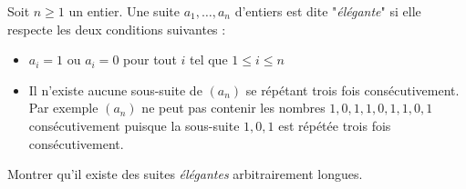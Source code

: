 Soit $n\ge 1$ un entier. Une suite $a_1, \dots, a_n$ d'entiers est dite "\textit{élégante}" si elle respecte les deux conditions suivantes :
\begin{itemize}
\item $a_i=1$ ou $a_i=0$ pour tout $i$ tel que $1\le i\le n$
\item Il n'existe aucune sous-suite de $(a_n)$ se répétant trois fois consécutivement. Par exemple $(a_n)$ ne peut pas contenir les nombres $1, 0, 1, 1, 0, 1, 1, 0, 1$ consécutivement puisque la sous-suite $1, 0, 1$ est répétée trois fois consécutivement.
\end{itemize}
Montrer qu'il existe des suites \textit{élégantes} arbitrairement longues.